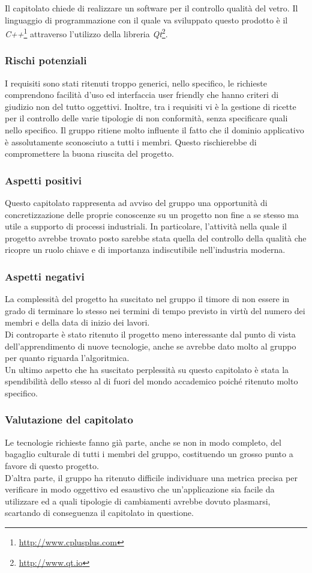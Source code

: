 Il capitolato chiede di realizzare un software per il controllo qualità del vetro. Il \gls{linguaggio di programmazione} con il quale va sviluppato questo prodotto è il \textit{C++}\footnote{\url{http://www.cplusplus.com}} attraverso l'utilizzo della libreria \textit{Qt}\footnote{\url{http://www.qt.io}}.
\subsubsection{Rischi potenziali}
I requisiti sono stati ritenuti troppo generici, nello specifico, le richieste comprendono facilità d'uso ed interfaccia user friendly che hanno criteri di giudizio non del tutto oggettivi.
Inoltre, tra i requisiti vi è la gestione di ricette per il controllo delle varie tipologie di non conformità, senza specificare quali nello specifico.
Il gruppo \GRUPPO{} ritiene molto influente il fatto che il dominio applicativo è assolutamente sconosciuto a tutti i membri. Questo rischierebbe di compromettere la buona riuscita del progetto.
\subsubsection{Aspetti positivi}
Questo capitolato rappresenta ad avviso del gruppo una opportunità di concretizzazione delle proprie conoscenze su un progetto non fine a se stesso ma utile a supporto di processi industriali. In particolare, l'attività nella quale il progetto avrebbe trovato posto sarebbe stata quella del controllo della qualità che ricopre un ruolo chiave e di importanza indiscutibile nell'industria moderna.
\subsubsection{Aspetti negativi}
La complessità del progetto ha suscitato nel gruppo il timore di non essere in grado di terminare lo stesso nei termini di tempo previsto in virtù del numero dei membri e della data di inizio dei lavori. \\
Di controparte è stato ritenuto il progetto meno interessante dal punto di vista dell'apprendimento di nuove tecnologie, anche se avrebbe dato molto al gruppo per quanto riguarda l'algoritmica.\\
Un ultimo aspetto che ha suscitato perplessità su questo capitolato è stata la spendibilità dello stesso al di fuori del mondo accademico poiché ritenuto molto specifico.
\subsubsection{Valutazione del capitolato}
Le tecnologie richieste fanno già parte, anche se non in modo completo, del bagaglio culturale di tutti i membri del gruppo, costituendo un grosso punto a favore di questo progetto. \\
D'altra parte, il gruppo ha ritenuto difficile individuare una metrica precisa per verificare in modo oggettivo ed esaustivo che un'applicazione sia facile da utilizzare ed a quali tipologie di cambiamenti avrebbe dovuto plasmarsi, scartando di conseguenza il capitolato in questione.

